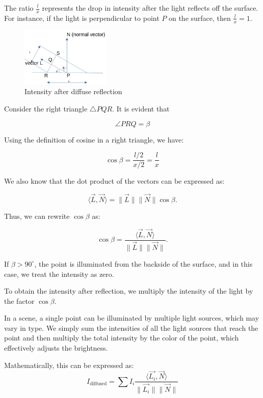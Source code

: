 \documentclass[conference]{IEEEtran}
\begin{document}
The ratio $ \frac{l}{x} $ represents the drop in intensity after the light reflects off the surface. For instance, if the light is perpendicular to point $ P $ on the surface, then $ \frac{l}{x} = 1 $.

\begin{figure}[htbp]
    \centerline{\includegraphics[width=0.38\textwidth]{./figs/intensity.png}}
    \caption{Intensity after diffuse reflection}
\end{figure}

Consider the right triangle $ \triangle PQR $. It is evident that 

$$\angle PRQ = \beta$$

Using the definition of cosine in a right triangle, we have:

$$\cos \beta = \frac{l/2}{x/2} = \frac{l}{x}$$

We also know that the dot product of the vectors can be expressed as:

$$\langle \vec{L}, \vec{N} \rangle = \|\vec{L}\| \|\vec{N}\| \cos \beta.$$

Thus, we can rewrite $ \cos \beta $ as:

$$\cos \beta = \frac{\langle \vec{L}, \vec{N} \rangle}{\|\vec{L}\| \|\vec{N}\|}.$$

If $ \beta > 90^\circ $, the point is illuminated from the backside of the surface, and in this case, we treat the intensity as zero.

To obtain the intensity after reflection, we multiply the intensity of the light by the factor $ \cos \beta $.

In a scene, a single point can be illuminated by multiple light sources, which may vary in type. We simply sum the intensities of all the light sources that reach the point and then multiply the total intensity by the color of the point, which effectively adjusts the brightness.

Mathematically, this can be expressed as:
\begin{equation}
    I_{\text{diffused}} = \sum I_i \frac{\langle \vec{L_i}, \vec{N} \rangle}{\|\vec{L_i}\| \|\vec{N}\|}
    \label{diffuse}
\end{equation}
    
\end{document}
